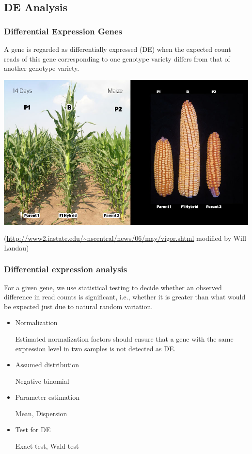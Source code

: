 \documentclass[handout,10pt]{beamer}
\begin{document}
\subsection{DE Analysis}
\begin{frame}
\frametitle{Differential Expression Genes}
\begin{definition}
A gene is regarded as differentially expressed (DE) when the expected count reads of this gene corresponding to one genotype variety differs from that of another genotype variety. 
\end{definition}

\pause
\begin{center}
\includegraphics{heterosis}
\end{center}

{\tiny (\url{http://www2.iastate.edu/~nscentral/news/06/may/vigor.shtml} modified by Will Landau)} 
\end{frame}


\begin{frame}
\frametitle{Differential expression analysis}

\begin{definition}
For a given gene, we use statistical testing to decide whether an observed difference in read counts is significant, i.e., whether it is greater than what would be expected just due to natural random variation.
\end{definition}

\begin{itemize}
\item Normalization

Estimated normalization factors should ensure that a gene with the same expression level in two samples is not detected as DE. 
\item Assumed distribution

Negative binomial

\item Parameter estimation

Mean, Dispersion

\item Test for DE

Exact test, Wald test

\end{itemize}

\end{frame}
\end{document}
